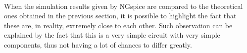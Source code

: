 \paragraph{} When the simulation results given by NGspice are compared to the theoretical ones obtained in the previous section, it is possible to highlight the fact that these are, in reality, extremely close to each other. Such observation can be explained by the fact that this is a very simple circuit with very simple components, thus not having a lot of chances to differ greatly.

